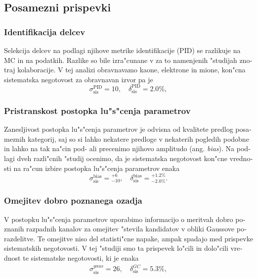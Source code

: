 \begin{otherlanguage}{slovene}
\subsection{Posamezni prispevki}

\subsubsection{Identifikacija delcev}
Selekcija delcev na podlagi njihove metrike identifikacije (PID) se razlikuje na MC in na podatkih. Razlike so bile izra"cunane v za to namenjenih "studijah znotraj kolaboracije. V tej analizi obravnavamo kaone, elektrone in mione, kon"cna sistematska negotovost za obravnavan izvor pa je
\begin{equation}
\sigma_{\mathrm{sis}}^{\mathrm{PID}} = 10,\quad \delta_{\mathrm{sis}}^{\mathrm{PID}} = 2.0\%,
\end{equation}

\subsubsection{Pristranskost postopka lu"s"cenja parametrov}
Zanesljivost postopka lu"s"cenja parametrov je odvisna od kvalitete predlog posameznih kategorij, saj so si lahko nekatere predloge v nekaterih pogledih podobne in lahko na tak na"cin pod- ali precenimo njihovo amplitudo (ang. \textit{bias}). Na podlagi dveh razli"cnih "studij ocenimo, da je sistematska negotovost kon"cne vrednosti na ra"cun izbire postopka lu"s"cenja parametrov enaka
\begin{equation}
\sigma_{\mathrm{sis}}^{\mathrm{bias}} = {}^{+6}_{-10},\quad \delta_{\mathrm{sis}}^{\mathrm{bias}} = {}^{+1.2\%}_{-2.0\%}.
\end{equation}

\subsubsection{Omejitev dobro poznanega ozadja}
V postopku lu"s"cenja parametrov uporabimo informacijo o meritvah dobro poznanih razpadnih kanalov za omejitev "stevila kandidatov v obliki Gaussove porazdelitve. Te omejitve niso del statisti"cne napake, ampak spadajo med prispevke sistematskih negotovosti. V tej "studiji smo ta prispevek lo"cili in dolo"cili vrednost te sistematske negotovosti, ki je enaka
\begin{align}
\sigma_{\mathrm{sis}}^{gaus} = 26,\quad \delta_{\mathrm{sis}}^{GC} = 5.3\%,
\end{align}


\end{otherlanguage}
